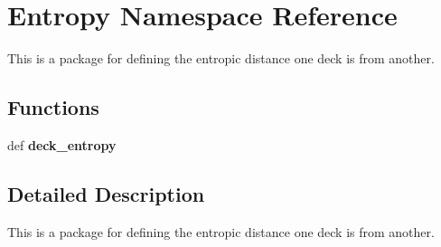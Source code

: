 \hypertarget{namespaceEntropy}{\section{Entropy Namespace Reference}
\label{namespaceEntropy}
}


This is a package for defining the entropic distance one deck is from another.  


\subsection*{Functions}
\begin{DoxyCompactItemize}
\item 
\hypertarget{namespaceEntropy_a231fd097d620c73851c81a6f42c1401f}{def {\bfseries deck\-\_\-entropy}}\label{namespaceEntropy_a231fd097d620c73851c81a6f42c1401f}

\end{DoxyCompactItemize}


\subsection{Detailed Description}
This is a package for defining the entropic distance one deck is from another. 